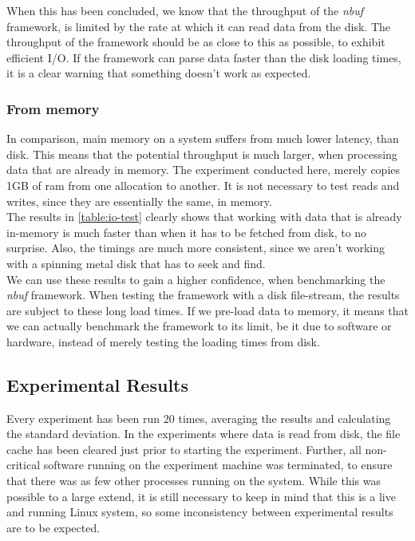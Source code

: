 \documentclass[a4paper]{article}
\newcommand{\nbuf}{\textit{nbuf} }
\begin{document}
When this has been concluded, we know that the throughput of the \nbuf framework, is limited by the rate at which it can read data from the disk. The throughput of the framework should be as close to this as possible, to exhibit efficient I/O. If the framework can parse data faster than the disk loading times, it is a clear warning that something doesn't work as expected.


\subsubsection{From memory}
In comparison, main memory on a system suffers from much lower latency, than disk. This means that the potential throughput is much larger, when processing data that are already in memory. The experiment conducted here, merely copies 1GB of ram from one allocation to another. It is not necessary to test reads and writes, since they are essentially the same, in memory.\\

The results in \autoref{table:io-test} clearly shows that working with data that is already in-memory is much faster than when it has to be fetched from disk, to no surprise. Also, the timings are much more consistent, since we aren't working with a spinning metal disk that has to seek and find.\\

We can use these results to gain a higher confidence, when benchmarking the \nbuf framework. When testing the framework with a disk file-stream, the results are subject to these long load times. If we pre-load data to memory, it means that we can actually benchmark the framework to its limit, be it due to software or hardware, instead of merely testing the loading times from disk.


\subsection{Experimental Results}
Every experiment has been run 20 times, averaging the results and calculating the standard deviation. In the experiments where data is read from disk, the file cache has been cleared just prior to starting the experiment. Further, all non-critical software running on the experiment machine was terminated, to ensure that there was as few other processes running on the system. While this was possible to a large extend, it is still necessary to keep in mind that this is a live and running Linux system, so some inconsistency between experimental results are to be expected.
\end{document}
